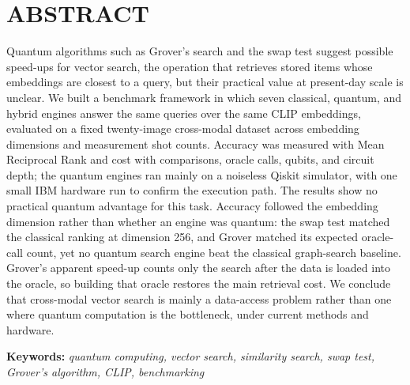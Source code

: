 \chapter*{ABSTRACT}


Quantum algorithms such as Grover's search and the swap test suggest possible
speed-ups for vector search, the operation that retrieves stored items whose
embeddings are closest to a query, but their practical value at present-day
scale is unclear. We built a benchmark framework in which seven classical,
quantum, and hybrid engines answer the same queries over the same CLIP
embeddings, evaluated on a fixed twenty-image cross-modal dataset across
embedding dimensions and measurement shot counts. Accuracy was measured with
Mean Reciprocal Rank and cost with comparisons, oracle calls, qubits, and
circuit depth; the quantum engines ran mainly on a noiseless Qiskit simulator,
with one small IBM hardware run to confirm the execution path. The results show
no practical quantum advantage for this task. Accuracy followed the embedding
dimension rather than whether an engine was quantum: the swap test matched the
classical ranking at dimension 256, and Grover matched its expected oracle-call
count, yet no quantum search engine beat the classical graph-search baseline.
Grover's apparent speed-up counts only the search after the data is loaded into
the oracle, so building that oracle restores the main retrieval cost. We conclude
that cross-modal vector search is mainly a data-access problem rather than one
where quantum computation is the bottleneck, under current methods and hardware.

\vspace{1em}
\noindent\textbf{Keywords:} \emph{quantum computing, vector search, similarity search, swap test, Grover's algorithm, CLIP, benchmarking}

\clearpage
